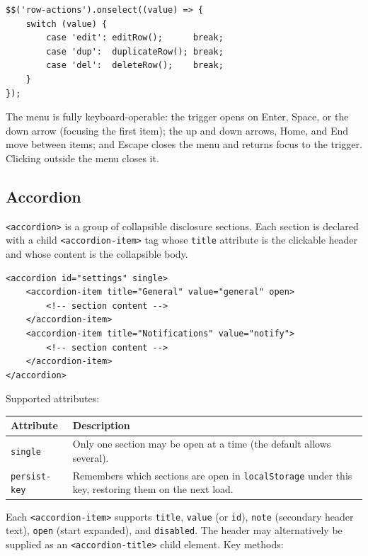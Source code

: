 \begin{lstlisting}[style=javascript]
$$('row-actions').onselect((value) => {
    switch (value) {
        case 'edit': editRow();      break;
        case 'dup':  duplicateRow(); break;
        case 'del':  deleteRow();    break;
    }
});
\end{lstlisting}

\noindent
The menu is fully keyboard-operable: the trigger opens on Enter, Space, or the down arrow (focusing the first item); the up and down arrows, Home, and End move between items; and Escape closes the menu and returns focus to the trigger.  Clicking outside the menu closes it.

\subsection{Accordion}
\label{sec:comp-accordion}

\texttt{<accordion>} is a group of collapsible disclosure sections.  Each section is declared with a child \texttt{<accordion-item>} tag whose \texttt{title} attribute is the clickable header and whose content is the collapsible body.

\begin{lstlisting}[style=html]
<accordion id="settings" single>
    <accordion-item title="General" value="general" open>
        <!-- section content -->
    </accordion-item>
    <accordion-item title="Notifications" value="notify">
        <!-- section content -->
    </accordion-item>
</accordion>
\end{lstlisting}

\noindent
Supported attributes:

\begin{longtable}{P{3.8cm}P{6.7cm}}
\toprule
\textbf{Attribute} & \textbf{Description} \\
\midrule
\endhead
\texttt{single} & Only one section may be open at a time (the default allows several). \\
\texttt{persist-key} & Remembers which sections are open in \texttt{localStorage} under this key, restoring them on the next load. \\
\bottomrule
\end{longtable}

\noindent
Each \texttt{<accordion-item>} supports \texttt{title}, \texttt{value} (or \texttt{id}), \texttt{note} (secondary header text), \texttt{open} (start expanded), and \texttt{disabled}.  The header may alternatively be supplied as an \texttt{<accordion-title>} child element.  Key methods:

